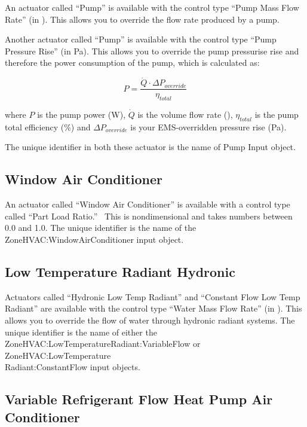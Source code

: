 An actuator called ``Pump'' is available with the control type ``Pump Mass Flow Rate'' (in \si{\massFlowRate}). This allows you to override the flow rate produced by a pump.

Another actuator called ``Pump'' is available with the control type ``Pump Pressure Rise'' (in \si{\pascal}). This allows you to override the pump pressurise rise and therefore the power consumption of the pump, which is calculated as:

\begin{equation}
    P = \frac{\dot{Q} \cdot \Delta P_{override}}{\eta_{total}}
\end{equation}

where $P$ is the pump power (\si{\watt}), $\dot{Q}$ is the volume flow rate (\si{\volumeFlowRate}), $\eta_{total}$ is the pump total efficiency (\%)
and $\Delta P_{override}$ is your EMS-overridden pressure rise (\si{\pascal}).

The unique identifier in both these actuator is the name of Pump Input object.

\subsection{Window Air Conditioner}\label{window-air-conditioner}

An actuator called ``Window Air Conditioner'' is available with a control type called ``Part Load Ratio.''~ This is nondimensional and takes numbers between 0.0 and 1.0. The unique identifier is the name of the ZoneHVAC:WindowAirConditioner input object.

\subsection{Low Temperature Radiant Hydronic}\label{low-temperature-radiant-hydronic}

Actuators called ``Hydronic Low Temp Radiant'' and ``Constant Flow Low Temp Radiant'' are available with the control type ``Water Mass Flow Rate'' (in \si{\massFlowRate}). This allows you to override the flow of water through hydronic radiant systems. The unique identifier is the name of either the ZoneHVAC:LowTemperatureRadiant:VariableFlow or ZoneHVAC:LowTemperature\\
Radiant:ConstantFlow input objects.

\subsection{Variable Refrigerant Flow Heat Pump Air Conditioner}\label{variable-refrigerant-flow-heat-pump-air-conditioner}

